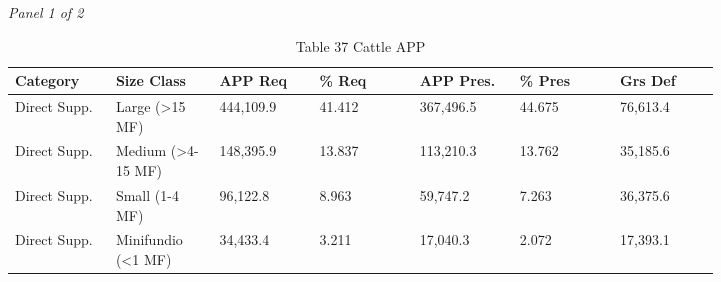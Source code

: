 \documentclass[12pt]{article}
\begin{document}
\begin{landscape}
\begin{table}[H]
\centering
\caption{Table 37 Cattle APP}
\textit{Panel 1 of 2}\\[2pt]
{\fontsize{12}{14}\selectfont
\setlength{\tabcolsep}{3pt}
\renewcommand{\arraystretch}{1.08}
\begin{tabular}{p{0.117\linewidth}p{0.117\linewidth}p{0.117\linewidth}p{0.117\linewidth}p{0.117\linewidth}p{0.117\linewidth}p{0.117\linewidth}}
\toprule
Category & Size Class & APP Req & \% Req & APP Pres. & \% Pres & Grs Def \\
\midrule
Direct Supp. & Large (>15 MF) & 444,109.9 & 41.412 & 367,496.5 & 44.675 & 76,613.4 \\
Direct Supp. & Medium (>4-15 MF) & 148,395.9 & 13.837 & 113,210.3 & 13.762 & 35,185.6 \\
Direct Supp. & Small (1-4 MF) & 96,122.8 & 8.963 & 59,747.2 & 7.263 & 36,375.6 \\
Direct Supp. & Minifundio (<1 MF) & 34,433.4 & 3.211 & 17,040.3 & 2.072 & 17,393.1 \\
\bottomrule
\end{tabular}
}

\vspace{0.6em}


\end{table}
\end{landscape}
\end{document}
